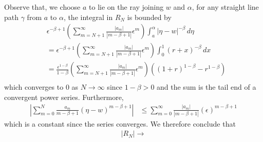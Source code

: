 \documentclass{article}
\begin{document}
Observe that, we choose $a$ to lie on the ray joining $w$ and $\alpha$, for any straight line path $\gamma$ from $a$ to $\alpha$, the integral in $R_N$ is bounded by 
\begin{align*}
& \epsilon^{ - \beta + 1} \left(\sum_{m = N + 1}^\infty \frac{|a_m|}{|m - \beta + 1|} \epsilon^{m}\right)
\int_a^{\alpha} |\eta - w|^{-\beta} \, d\eta \\
&= \epsilon^{ - \beta + 1} \left(\sum_{m = N + 1}^\infty \frac{|a_m|}{|m - \beta + 1|} \epsilon^{m}\right)
\int_0^{1} (r + x)^{-\beta} \, dx \\
&=  \frac{\epsilon^{ 1 - \beta}}{1 - \beta} \left(\sum_{m = N + 1}^\infty \frac{|a_m|}{|m - \beta + 1|} \epsilon^{m}\right) \left((1 + r)^{ 1 - \beta} - r^{1 - \beta}\right) \\
\end{align*}
which converges to $0$ as $N \to \infty$ since $1 - \beta > 0 $ and the sum is the tail end of a convergent power series. Furthermore, 
\begin{align*}
\left |\sum_{m = 0}^N \frac{a_m}{m - \beta + 1} (\eta - w)^{m - \beta + 1}\right| 
&\leq \sum_{m = 0}^\infty \frac{|a_m|}{|m - \beta + 1|} (\epsilon)^{m - \beta + 1}
\end{align*}
which is a constant since the series converges. We therefore conclude that
\begin{align*}
|R_N| \to 
\end{align*}
\end{document}
